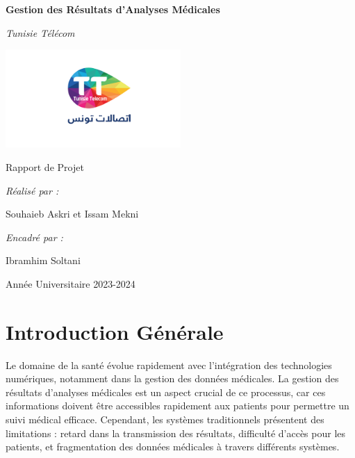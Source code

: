 \documentclass[12pt,a4paper]{report}
\begin{document}
\begin{titlepage}
\begin{center}
    \vspace*{2cm}
    {\Huge\bfseries Gestion des Résultats d'Analyses Médicales\par}
    \vspace{2cm}
    {\Large\itshape Tunisie Télécom\par}
    
    \includegraphics[width=0.5\textwidth]{./img/tt.png} %
    \vspace{3cm} %
    
    {\Large Rapport de Projet\par} %
    \vspace{3cm}
    
    {\Large\itshape Réalisé par :\par}
    {\Large Souhaieb Askri et Issam Mekni\par}
    \vspace{1.5cm}
    
    {\Large\itshape Encadré par :\par}
    {\Large Ibramhim Soltani\par}
    \vfill
    {\Large Année Universitaire 2023-2024\par}
\end{center}
\end{titlepage}


\tableofcontents
\newpage

\chapter{Introduction Générale}

Le domaine de la santé évolue rapidement avec l'intégration des technologies numériques, notamment dans la gestion des données médicales. La gestion des résultats d'analyses médicales est un aspect crucial de ce processus, car ces informations doivent être accessibles rapidement aux patients pour permettre un suivi médical efficace. Cependant, les systèmes traditionnels présentent des limitations : retard dans la transmission des résultats, difficulté d'accès pour les patients, et fragmentation des données médicales à travers différents systèmes.
\end{document}
